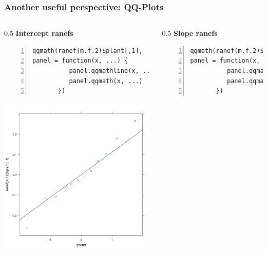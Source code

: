 \documentclass{beamer}
\begin{document}
\begin{frame}[fragile]
\frametitle{Another useful perspective: QQ-Plots}
    \begin{columns}
        \begin{column}{0.5\textwidth}
        \textbf{Intercept ranefs}
        \scriptsize
            \begin{Verbatim}[numbers=left,numbersep=6pt,frame=single]
qqmath(ranef(m.f.2)$plant[,1], 
panel = function(x, ...) {
          panel.qqmathline(x, ...)
          panel.qqmath(x, ...)
       })                
            \end{Verbatim}
            \includegraphics[width=\textwidth]{lectures/day_7_diagnostics_of_mems/figures/unnamed-chunk-18-1.png}
        \end{column}
        \begin{column}{0.5\textwidth}
        \textbf{Slope ranefs}
        \scriptsize
            \begin{Verbatim}[numbers=left,numbersep=6pt,frame=single]
qqmath(ranef(m.f.2)$plant[,2], 
panel = function(x, ...) {
          panel.qqmathline(x, ...)
          panel.qqmath(x, ...)
       })               
            \end{Verbatim}

\end{column}
\end{columns}
\end{frame}
\end{document}

